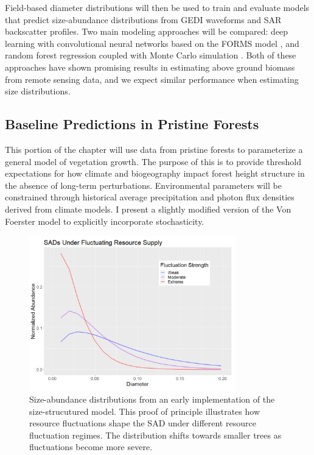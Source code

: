 Field-based diameter distributions will then be used to train and evaluate models that predict size-abundance distributions from GEDI waveforms and SAR backscatter profiles. Two main modeling approaches will be compared: deep learning with convolutional neural networks based on the FORMS model \cite{schwartz_forms_2023}, and random forest regression coupled with Monte Carlo simulation \cite{li_aboveground_2022}. Both of these approaches have shown promising results in estimating above ground biomass from remote sensing data, and we expect similar performance when estimating size distributions.

\subsection{Baseline Predictions in Pristine Forests}

This portion of the chapter will use data from pristine forests to parameterize a general model of vegetation growth. The purpose of this is to provide threshold expectations for how climate and biogeography impact forest height structure in the absence of long-term perturbations. Environmental parameters will be constrained through historical average precipitation and photon flux densities derived from climate models. I present a slightly modified version of the Von Foerster model to explicitly incorporate stochasticity.

\begin{figure}[ht!]
    \centering
    \includegraphics[width=0.8\textwidth]{figures/SAD_fig.png} 
    \caption{Size-abundance distributions from an early implementation of the size-strucutured model. This proof of principle illustrates how resource fluctuations shape the SAD under different resource fluctuation regimes. The distribution shifts towards smaller trees as fluctuations become more severe.}
    \label{fig:SAD}
\end{figure} 

